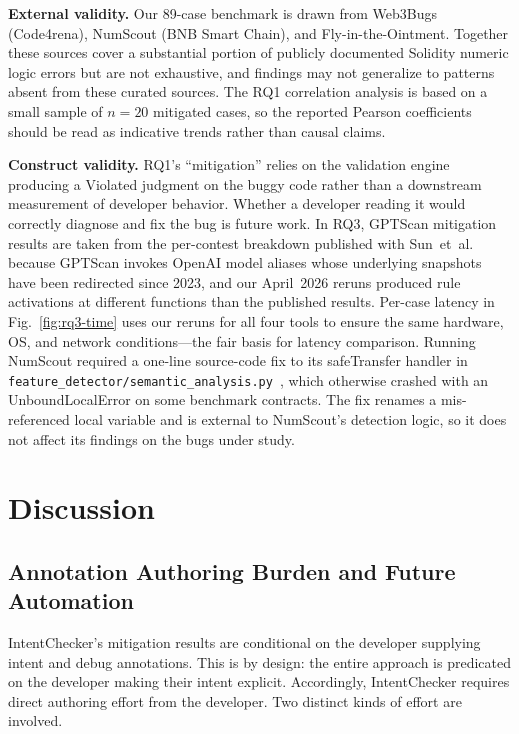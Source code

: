 \documentclass[pdflatex,sn-basic]{sn-jnl}%
\theoremstyle{thmstyleone}%
\theoremstyle{thmstyletwo}%
\theoremstyle{thmstylethree}%
\begin{document}
\smallskip
\noindent\textbf{External validity.}
Our 89-case benchmark is drawn from Web3Bugs (Code4rena), NumScout (BNB Smart Chain), and Fly-in-the-Ointment. Together these sources cover a substantial portion of publicly documented Solidity numeric logic errors but are not exhaustive, and findings may not generalize to patterns absent from these curated sources.
The RQ1 correlation analysis is based on a small sample of $n=20$ mitigated cases, so the reported Pearson coefficients should be read as indicative trends rather than causal claims.

\smallskip
\noindent\textbf{Construct validity.}
RQ1's ``mitigation'' relies on the validation engine producing a Violated judgment on the buggy code rather than a downstream measurement of developer behavior. Whether a developer reading it would correctly diagnose and fix the bug is future work.
In RQ3, GPTScan mitigation results are taken from the per-contest breakdown published with Sun~et~al.~\citep{gptscan,gptscan_web3bugs} because GPTScan invokes OpenAI model aliases whose underlying snapshots have been redirected since 2023, and our April~2026 reruns produced rule activations at different functions than the published results. Per-case latency in Fig.~\ref{fig:rq3-time} uses our reruns for all four tools to ensure the same hardware, OS, and network conditions---the fair basis for latency comparison.
Running NumScout required a one-line source-code fix to its safeTransfer handler in \texttt{feature\_detector/semantic\_analysis.py}~\citep{numscout_semantic}, which otherwise crashed with an UnboundLocalError on some benchmark contracts. The fix renames a mis-referenced local variable and is external to NumScout's detection logic, so it does not affect its findings on the bugs under study.

\section{Discussion}\label{sec:discussion}

\subsection{Annotation Authoring Burden and Future Automation}\label{sec:disc:burden}

IntentChecker's mitigation results are conditional on the developer supplying intent and debug annotations.
This is by design: the entire approach is predicated on the developer making their intent explicit. Accordingly, IntentChecker requires direct authoring effort from the developer.
Two distinct kinds of effort are involved.
\end{document}
